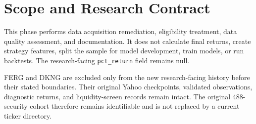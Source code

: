 \section{Scope and Research Contract}

This phase performs data acquisition remediation, eligibility treatment, data
quality assessment, and documentation. It does not calculate final returns,
create strategy features, split the sample for model development, train models,
or run backtests. The research-facing \texttt{pct\_return} field remains null.

FERG and DKNG are excluded only from the new research-facing history before
their stated boundaries. Their original Yahoo checkpoints, validated
observations, diagnostic returns, and liquidity-screen records remain intact.
The original 488-security cohort therefore remains identifiable and is not
replaced by a current ticker directory.
